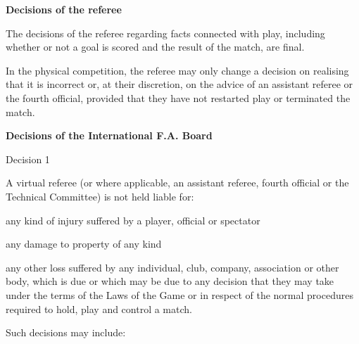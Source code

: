 \bigskip

{\bfseries Decisions of the referee}

\headlinebox

The decisions of the referee regarding facts connected with play, including whether or not a goal is scored and the result of the match, are final.

\bigskip

In the physical competition, the referee may only change a decision on realising that it is incorrect or, at their discretion, on the advice of an assistant referee or the fourth official, provided that they have not restarted play or terminated the match.


\clearpage
{\bfseries Decisions of the International F.A. Board }

\headlinebox

Decision 1

A virtual referee (or where applicable, an assistant referee, fourth official or the Technical Committee) is not held liable for:

any kind of injury suffered by a player, official or spectator

any damage to property of any kind

any other loss suffered by any individual, club, company, association or other body, which is due or which may be due to any decision that they may take under the terms of the Laws of the Game or in respect of the normal procedures required to hold, play and control a match.

\bigskip

Such decisions may include:

